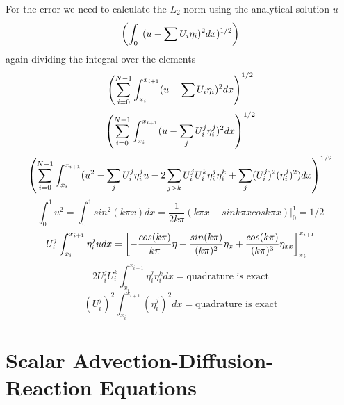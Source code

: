 \documentclass[10pt,dvips,twoside,reqno]{amsart}
\begin{document}
For the error we need to calculate the $L_2$ norm using the analytical solution
$u$
\begin{equation}
\left( \int_0^1 (u - \sum U_i \eta_i)^2 dx )^{1/2} \right)
\end{equation}
again dividing the integral over the elements
\begin{equation}
\left( \sum_{i=0}^{N-1} \int_{x_i}^{x_{i+1}} (u - \sum U_i \eta_i)^2 dx  \right)^{1/2}
\end{equation}
\begin{equation}
\left( \sum_{i=0}^{N-1} \int_{x_i}^{x_{i+1}} (u - \sum_{j} U_i^j \eta_i^j)^2 dx  \right)^{1/2}
\end{equation}
\begin{equation}
\left( \sum_{i=0}^{N-1} \int_{x_i}^{x_{i+1}} (u^2 - \sum_j U_i^j \eta_i^j u - 2 \sum_{j > k} U_i^j U_i^k \eta_i^j \eta_i^k + \sum_j  (U_i^j)^2 (\eta_i^j)^2) dx  \right)^{1/2}
\end{equation}
\begin{equation}
\int_0^1 u^2 = \int_0^1 sin^2(k \pi x) dx = \frac{1}{2 k \pi}(k \pi x - sin k \pi x cos k \pi x)|_0^1 = 1/2
\end{equation}
\begin{equation}
U_i^j \int_{x_i}^{x_{i+1}}  \eta_i^j u dx = \left[-\frac{cos(k \pi)}{k \pi} \eta + \frac{sin(k \pi)}{(k \pi)^2} \eta_x + \frac{cos(k \pi)}{(k \pi)^3} \eta_{xx} \right]_{x_i}^{x_{i+1}}
\end{equation}
\begin{equation}
2 U_i^j U_i^k \int_{x_i}^{x_{i+1}} \eta_i^j \eta_i^k dx = \mbox{quadrature is exact}
\end{equation}
\begin{equation}
(U_i^j)^2 \int_{x_i}^{x_{i+1}} (\eta_i^j)^2 dx = \mbox{quadrature is exact}
\end{equation}

\section{Scalar Advection-Diffusion-Reaction Equations}
\end{document}
